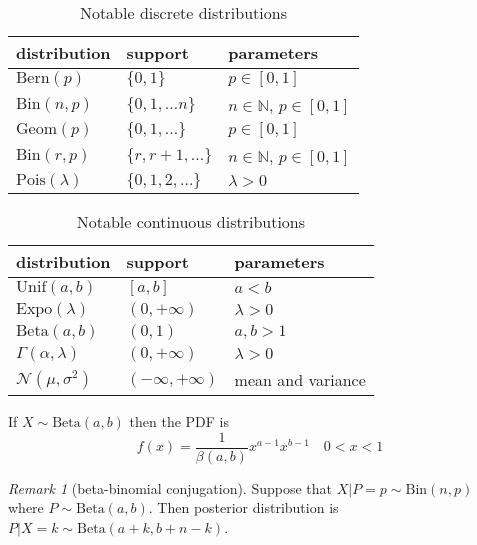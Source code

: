 \documentclass{article}
\theoremstyle{definition}
\theoremstyle{remark}
\newtheorem{remark}[theorem]{Remark}
\newcommand{\Bern}{\mathrm{Bern}}
\newcommand{\Bin}{\mathrm{Bin}}
\newcommand{\Geom}{\mathrm{Geom}}
\newcommand{\NBin}{\mathrm{Bin}}
\newcommand{\Pois}{\mathrm{Pois}}
\newcommand{\Unif}{\mathrm{Unif}}
\newcommand{\Expo}{\mathrm{Expo}}
\newcommand{\Norm}{\mathcal{N}}
\newcommand{\BetaD}{\mathrm{Beta}}
\newcommand{\dist}{\sim}
\begin{document}
\begin{table}[htbp]
	\caption{Notable discrete distributions}
	\begin{center}
		\begin{tabular}[c]{l|l|l}
			\hline
			distribution       & support              & parameters                         \\
			\hline
			\(\Bern(p)\)       & \(\{0,1\}\)          & \(p\in [0,1]\)                     \\
			\(\Bin(n,p)\)      & \(\{0,1,\ldots n\}\) & \(n\in\mathbb{N}\), \(p\in [0,1]\) \\
			\(\Geom(p)\)       & \(\{0,1,\ldots\}\)   & \(p\in [0,1]\)                     \\
			\(\NBin(r,p)\)     & \(\{r,r+1,\ldots\}\) & \(n\in\mathbb{N}\), \(p\in [0,1]\) \\
			\(\Pois(\lambda)\) & \(\{0,1,2,\ldots\}\) & \(\lambda > 0\)                    \\
			\hline
		\end{tabular}
	\end{center}
\end{table}

\begin{table}[htbp]
	\caption{Notable continuous distributions}
	\begin{center}
		\begin{tabular}[c]{l|l|l}
			\hline
			distribution               & support               & parameters        \\
			\hline
			\(\Unif(a,b)\)             & \([a,b]\)             & \(a<b\)           \\
			\(\Expo(\lambda)\)         & \((0,+\infty)\)       & \(\lambda>0\)     \\
			\(\BetaD(a,b)\)            & \((0,1)\)             & \(a,b>1\)         \\
			\(\Gamma(\alpha,\lambda)\) & \((0,+\infty)\)       & \(\lambda>0\)     \\
			\(\Norm(\mu,\sigma^2)\)    & \((-\infty,+\infty)\) & mean and variance \\
			\hline
		\end{tabular}
	\end{center}
\end{table}

If \(X\dist\BetaD(a,b)\) then the PDF is
\[
	f(x) = \frac{1}{\beta(a,b)} x^{a-1} x^{b-1}
	\quad 0<x<1
\]

\begin{remark}[beta-binomial conjugation]
	Suppose that \(X|P=p\dist\Bin(n,p)\) where \(P\dist\BetaD(a,b)\).
	Then posterior distribution is \(P|X=k \dist \BetaD(a+k,b+n-k)\).
\end{remark}
\end{document}
